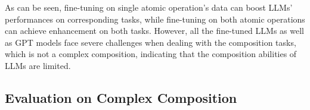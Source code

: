 
As can be seen, fine-tuning on single atomic operation's data can boost LLMs' performances on corresponding tasks, while fine-tuning on both atomic operations can achieve enhancement on both tasks. However, all the fine-tuned LLMs as well as GPT models face severe challenges when dealing with the composition tasks, which is not a complex composition, indicating that the composition abilities of LLMs are limited.









\subsection{Evaluation on Complex Composition}
\label{sec:complex composition}


